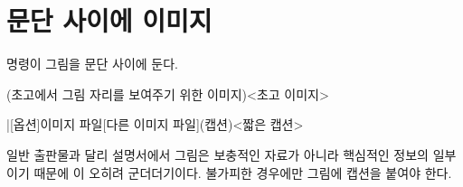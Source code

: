 \documentclass[minted]{hzguide}
\begin{document}
\section{문단 사이에 이미지}

\macro{\image} 명령이 그림을 문단 사이에 둔다.

\begin{coderesult}
(초고에서 그림 자리를 보여주기 위한 이미지)<초고 이미지>
\end{coderesult}

\begin{code}
\image*|[옵션]{이미지 파일}[다른 이미지 파일](캡션)<짧은 캡션>
\end{code}

일반 출판물과 달리 설명서에서 그림은 보충적인 자료가 아니라 핵심적인 정보의 일부이기 때문에 이 오히려 군더더기이다. 불가피한 경우에만 그림에 캡션을 붙여야 한다.
\end{document}
